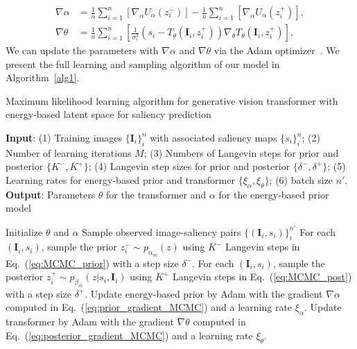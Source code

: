 \documentclass{article}
\begin{document}
\begin{align}
    \nabla{\alpha}&= \frac{1}{n}\sum_{i=1}^{n}[\nabla_{\alpha} U_{\alpha}(z_i^{-})]- \frac{1}{n}\sum_{i=1}^{n} \left[\nabla_{\alpha} U_{\alpha}(z_{i}^{+})\right],  \label{eq:prior_gradient_MCMC}
\\
    \nabla{\theta}&= \frac{1}{n}\sum_{i=1}^{n}\left[\frac{1}{\sigma_{\epsilon}^2}(s_i-T_{\theta}(\textbf{I}_i,z_i^{+})) \nabla_{\theta} T_{\theta}(\textbf{I}_i,z_i^{+})\right] ,\label{eq:posterior_gradient_MCMC} \end{align}
We can update the parameters with $\nabla{\alpha}$ and $\nabla{\theta}$ via the Adam optimizer~\cite{kingma2014adam}. We present the full learning and sampling algorithm of our model in Algorithm~\ref{alg1}.


\begin{algorithm}[H]
\small
\caption{Maximum likelihood learning algorithm for generative vision transformer with energy-based latent space for saliency prediction}
\textbf{Input}: (1) Training images $\{\textbf{I}_i\}_{i}^{n}$ with associated saliency maps $\{s_i\}_{i}^{n}$;
(2) Number of learning iterations $M$; (3) Numbers of Langevin steps for prior and posterior $\{K^{-},K^{+}\}$; (4) Langevin step sizes for prior and posterior $\{\delta^{-},\delta^{+}\}$; (5) Learning rates for energy-based prior and transformer $\{\xi_\alpha,\xi_\theta\}$; (6) batch size $n'$.\\
\textbf{Output}: 
Parameters $\theta$ for the transformer and $\alpha$ for the energy-based prior model
\begin{algorithmic}[1]
\State Initialize $\theta$ and $\alpha$ 
\State Sample observed image-saliency pairs $\{(\textbf{I}_i,s_i)\}_i^{n'}$
\State For each $(\textbf{I}_i,s_i)$, sample the prior $z_i^{-} \sim p_{\alpha_m}(z)$ using $K^{-}$ Langevin steps in Eq.~(\ref{eq:MCMC_prior}) with a step size $\delta^{-}$. 
\State For each $(\textbf{I}_i,s_i)$, sample the posterior $z_i^{+} \sim p_{\beta_m}(z|s_i,\textbf{I}_i)$ using $K^{+}$ Langevin steps in  Eq.~(\ref{eq:MCMC_post}) with a step size $\delta^{+}$. 
\State Update energy-based prior by Adam with the gradient $\nabla{\alpha}$ computed in Eq.~(\ref{eq:prior_gradient_MCMC}) and a learning rate $\xi_\alpha$.
\State Update transformer by Adam with the gradient $\nabla{\theta}$ computed in Eq.~(\ref{eq:posterior_gradient_MCMC}) and a learning rate $\xi_\theta$.
\EndFor
\end{algorithmic} \label{alg1}
\end{algorithm}
\end{document}
